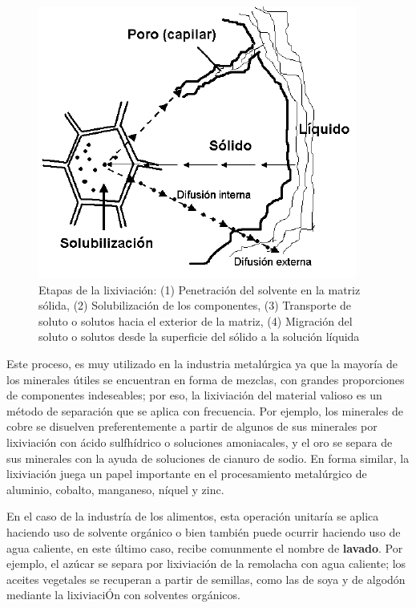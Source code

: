 \documentclass[11pt]{book}
\begin{document}
\begin{figure}[H]
    \centering
    \includegraphics{img/lixiviacion/ProcesoLixiviacion.PNG}
    \caption{Etapas de la lixiviación: (1) Penetración del solvente en la matriz sólida, (2) Solubilización de los componentes, (3) Transporte de soluto o solutos hacia el exterior de la matriz, (4) Migración del soluto o solutos desde la superficie del sólido a la solución líquida}
    \label{fig:Lixiviacion_1}
\end{figure}

Este proceso, es muy utilizado en la industria metalúrgica ya que la mayoría de los minerales útiles se encuentran en forma de mezclas, con grandes proporciones de componentes indeseables; por eso, la lixiviación del material valioso es un método de separación que se aplica con frecuencia. Por ejemplo, los minerales de cobre se disuelven preferentemente a partir de algunos de sus minerales por lixiviación con ácido sulfhídrico o soluciones amoniacales, y el
oro se separa de sus minerales con la ayuda de soluciones de cianuro de sodio. En forma similar, la lixiviación juega un papel importante en el procesamiento metalúrgico de aluminio, cobalto, manganeso, níquel y zinc.

En el caso de la industría de los alimentos, esta operación unitaría se aplica haciendo uso de solvente orgánico o bien también puede ocurrir haciendo uso de agua caliente, en este último caso, recibe comunmente el nombre de \textbf{lavado}. Por ejemplo, el azúcar se separa por lixiviación de la remolacha con agua caliente; los aceites vegetales se recuperan a partir de semillas, como las de soya y de algodón mediante la lixiviaciÓn con solventes orgánicos.
\end{document}
